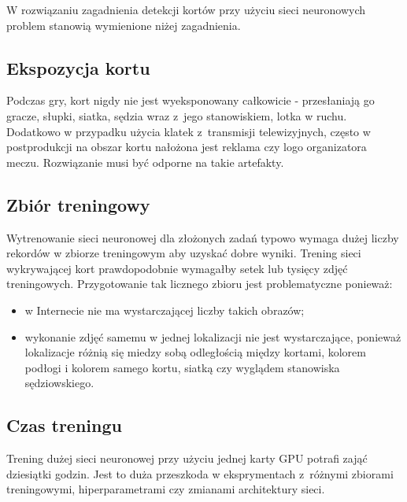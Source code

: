 W rozwiązaniu zagadnienia detekcji kortów przy użyciu sieci neuronowych problem stanowią wymienione niżej zagadnienia.

\subsection*{Ekspozycja kortu}

Podczas gry, kort nigdy nie jest wyeksponowany całkowicie - przesłaniają go gracze, słupki, siatka, sędzia wraz z~jego stanowiskiem, lotka w ruchu.
Dodatkowo w przypadku użycia klatek z~transmisji telewizyjnych, często w postprodukcji na obszar kortu nałożona jest reklama czy logo organizatora meczu.
Rozwiązanie musi być odporne na takie artefakty.

\subsection*{Zbiór treningowy}

Wytrenowanie sieci neuronowej dla złożonych zadań typowo wymaga dużej liczby rekordów w zbiorze treningowym aby uzyskać dobre wyniki.
Trening sieci wykrywającej kort prawdopodobnie wymagałby setek lub tysięcy zdjęć treningowych.
Przygotowanie tak licznego zbioru jest problematyczne ponieważ:

\begin{itemize}
	\item w Internecie nie ma wystarczającej liczby takich obrazów;
	\item wykonanie zdjęć samemu w jednej lokalizacji nie jest wystarczające, ponieważ lokalizacje różnią się miedzy sobą odległością między kortami, kolorem podłogi i kolorem samego kortu, siatką czy wyglądem stanowiska sędziowskiego.
\end{itemize}

\subsection*{Czas treningu}

Trening dużej sieci neuronowej przy użyciu jednej karty GPU potrafi zająć dziesiątki godzin.
Jest to duża przeszkoda w eksprymentach z~różnymi zbiorami treningowymi, hiperparametrami czy zmianami architektury sieci.
